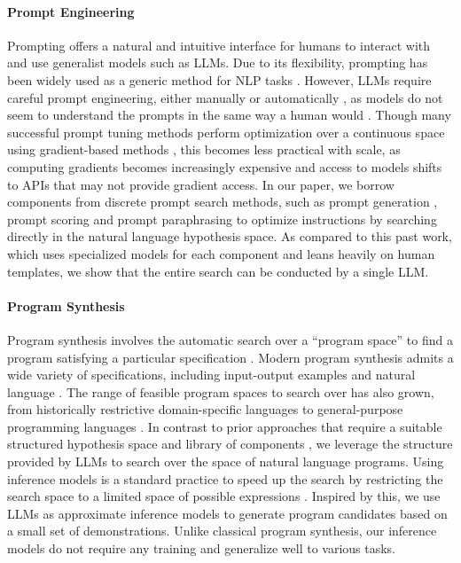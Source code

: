 \paragraph{Prompt Engineering}
Prompting offers a natural and intuitive interface for humans to interact with and use generalist models such as LLMs. Due to its flexibility, prompting has been widely used as a generic method for NLP tasks \citep{schick2021exploiting, brown2020language, sanh2022multitask}. However, LLMs require careful prompt engineering, either manually \citep{reynolds2021prompt} or automatically \citep{gao2021making, shin2020autoprompt}, as models do not seem to understand the prompts in the same way a human would \citep{webson2021prompt, lu2021fantastically}. Though many successful prompt tuning methods perform optimization over a continuous space using gradient-based methods \citep{liu2021gpt, qin2021learning,lester2021power}, this becomes less practical with scale, as computing gradients becomes increasingly expensive and access to models shifts to APIs that may not provide gradient access. 
In our paper, we borrow components from discrete prompt search methods, such as prompt generation \citep{gao2021making, ben2021pada}, prompt scoring \citep{davison2019commonsense} and prompt paraphrasing \citep{jiang2020can, yuan2021bartscore} to optimize instructions by searching directly in the natural language hypothesis space. 
As compared to this past work, which uses specialized models for each component and leans heavily on human templates, we show that the entire search can be conducted by a single LLM.

\paragraph{Program Synthesis} Program synthesis involves the automatic search over a ``program space'' to find a program satisfying a particular specification \citep{gulwani2017program}. 
Modern program synthesis admits a wide variety of specifications, including input-output examples \citep{ellis2021dreamcoder,wong2021leveraging} and natural language \citep{jain2022jigsaw}. The range of feasible program spaces to search over has also grown, from historically restrictive domain-specific languages to general-purpose programming languages \citep{austin2021program}. In contrast to prior approaches that require a suitable structured hypothesis space and library of components \citep{liang2010learning, ellis2018learning}, we leverage the structure provided by LLMs to search over the space of natural language programs. 
Using inference models is a standard practice to speed up the search by restricting the search space to a limited space of possible expressions  \citep{menon2013machine, lee2018accelerating, devlin2017neural, ellis2021dreamcoder}. 
Inspired by this, we use LLMs as approximate inference models to generate program candidates based on a small set of demonstrations. Unlike classical program synthesis, our inference models do not require any training and generalize well to various tasks.

